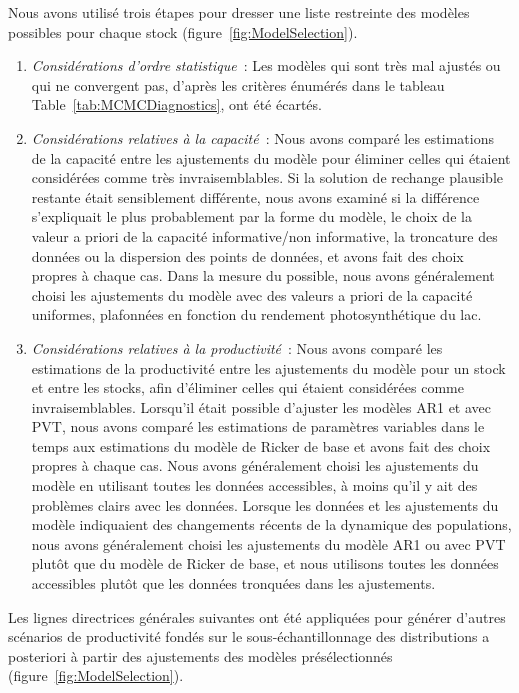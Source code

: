\documentclass[french,11pt]{book}
\begin{document}
Nous avons utilisé trois étapes pour dresser une liste restreinte des modèles possibles pour chaque stock (figure~\ref{fig:ModelSelection}).
\begin{enumerate}
\def\labelenumi{\arabic{enumi}.}

\item
  \emph{Considérations d'ordre statistique}~: Les modèles qui sont très mal ajustés ou qui ne convergent pas, d'après les critères énumérés dans le tableau Table~\ref{tab:MCMCDiagnostics}, ont été écartés.
\item
  \emph{Considérations relatives à la capacité}~: Nous avons comparé les estimations de la capacité entre les ajustements du modèle pour éliminer celles qui étaient considérées comme très invraisemblables. Si la solution de rechange plausible restante était sensiblement différente, nous avons examiné si la différence s'expliquait le plus probablement par la forme du modèle, le choix de la valeur a priori de la capacité informative/non informative, la troncature des données ou la dispersion des points de données, et avons fait des choix propres à chaque cas. Dans la mesure du possible, nous avons généralement choisi les ajustements du modèle avec des valeurs a priori de la capacité uniformes, plafonnées en fonction du rendement photosynthétique du lac.
\item
  \emph{Considérations relatives à la productivité}~: Nous avons comparé les estimations de la productivité entre les ajustements du modèle pour un stock et entre les stocks, afin d'éliminer celles qui étaient considérées comme invraisemblables. Lorsqu'il était possible d'ajuster les modèles AR1 et avec PVT, nous avons comparé les estimations de paramètres variables dans le temps aux estimations du modèle de Ricker de base et avons fait des choix propres à chaque cas. Nous avons généralement choisi les ajustements du modèle en utilisant toutes les données accessibles, à moins qu'il y ait des problèmes clairs avec les données. Lorsque les données et les ajustements du modèle indiquaient des changements récents de la dynamique des populations, nous avons généralement choisi les ajustements du modèle AR1 ou avec PVT plutôt que du modèle de Ricker de base, et nous utilisons toutes les données accessibles plutôt que les données tronquées dans les ajustements.
\end{enumerate}
Les lignes directrices générales suivantes ont été appliquées pour générer d'autres scénarios de productivité fondés sur le sous-échantillonnage des distributions a posteriori à partir des ajustements des modèles présélectionnés (figure~\ref{fig:ModelSelection}).
\end{document}
